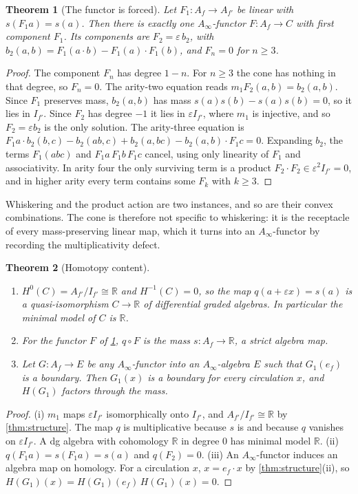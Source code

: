 \documentclass[11pt]{article}
\newtheorem{theorem}{Theorem}[section]
\theoremstyle{definition}
\theoremstyle{remark}
\newcommand{\R}{\mathbb{R}}
\begin{document}
\begin{theorem}[The functor is forced]\label{thm:forced}
Let $F_1\colon A_f\to A_{f'}$ be linear with $s(F_1a)=s(a)$. Then there is exactly one $A_\infty$-functor $F\colon A_f\to C$ with
first component $F_1$. Its components are $F_2=\varepsilon\,b_2$, with $b_2(a,b)=F_1(a\cdot b)-F_1(a)\cdot F_1(b)$, and $F_n=0$ for
$n\ge3$.
\end{theorem}
\begin{proof}
The component $F_n$ has degree $1-n$. For $n\ge3$ the cone has nothing in that degree, so $F_n=0$. The arity-two equation
reads $m_1F_2(a,b)=b_2(a,b)$. Since $F_1$ preserves mass, $b_2(a,b)$ has mass $s(a)s(b)-s(a)s(b)=0$, so it lies in $I_{f'}$.
Since $F_2$ has degree $-1$ it lies in $\varepsilon I_{f'}$, where $m_1$ is injective, and so $F_2=\varepsilon b_2$ is the only solution. The arity-three
equation is $F_1a\cdot b_2(b,c)-b_2(ab,c)+b_2(a,bc)-b_2(a,b)\cdot F_1c=0$. Expanding $b_2$, the terms $F_1(abc)$ and
$F_1a\,F_1b\,F_1c$ cancel, using only linearity of $F_1$ and associativity. In arity four the only surviving term is a
product $F_2\cdot F_2\in\varepsilon^2I_{f'}=0$, and in higher arity every term contains some $F_k$ with $k\ge3$.
\end{proof}

Whiskering and the product action are two instances, and so are their convex combinations. The cone is therefore not
specific to whiskering: it is the receptacle of every mass-preserving linear map, which it turns into an $A_\infty$-functor
by recording the multiplicativity defect.

\begin{theorem}[Homotopy content]\label{thm:homotopy}
\begin{enumerate}[label=(\roman*)]
\item $H^0(C)=A_{f'}/I_{f'}\cong\R$ and $H^{-1}(C)=0$, so the map $q(a+\varepsilon x)=s(a)$ is a quasi-isomorphism $C\to\R$ of
  differential graded algebras. In particular the minimal model of $C$ is $\R$.
\item For the functor $F$ of \cref{thm:forced}, $q\circ F$ is the mass $s\colon A_f\to\R$, a strict algebra map.
\item Let $G\colon A_f\to E$ be any $A_\infty$-functor into an $A_\infty$-algebra $E$ such that $G_1(e_f)$ is a boundary. Then
  $G_1(x)$ is a boundary for every circulation $x$, and $H(G_1)$ factors through the mass.
\end{enumerate}
\end{theorem}
\begin{proof}
(i) $m_1$ maps $\varepsilon I_{f'}$ isomorphically onto $I_{f'}$, and $A_{f'}/I_{f'}\cong\R$ by \cref{thm:structure}. The map $q$ is
multiplicative because $s$ is and because $q$ vanishes on $\varepsilon I_{f'}$. A dg algebra with cohomology $\R$ in degree $0$ has
minimal model $\R$. (ii) $q(F_1a)=s(F_1a)=s(a)$ and $q(F_2)=0$. (iii) An $A_\infty$-functor induces an algebra map on homology.
For a circulation $x$, $x=e_f\cdot x$ by \cref{thm:structure}(ii), so $H(G_1)(x)=H(G_1)(e_f)\,H(G_1)(x)=0$.
\end{proof}
\end{document}
